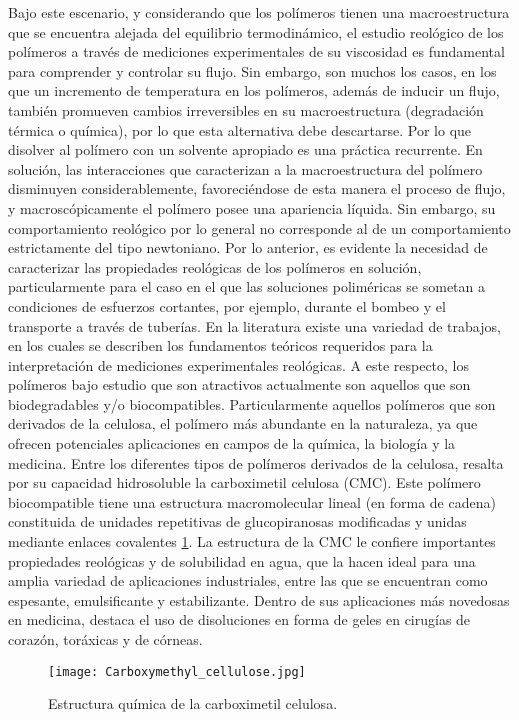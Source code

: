 \documentclass{elsarticle}
\begin{document}
Bajo este escenario, y considerando que los pol\'imeros tienen una macroestructura que se encuentra alejada del equilibrio termodin\'amico, el estudio reol\'ogico de los pol\'imeros a trav\'es de mediciones experimentales de su viscosidad es fundamental para comprender y controlar su flujo. Sin embargo, son muchos los casos, en los que un incremento de temperatura en los pol\'imeros, adem\'as de inducir un flujo, también promueven cambios irreversibles en su macroestructura (degradación t\'ermica o qu\'imica), por lo que esta alternativa debe descartarse. Por lo que disolver al pol\'imero con un solvente apropiado es una práctica recurrente\cite{R5}. En soluci\'on, las interacciones que caracterizan a la macroestructura del pol\'imero disminuyen considerablemente, favoreciéndose de esta manera el proceso de flujo, y macrosc\'opicamente el pol\'imero posee una apariencia l\'iquida. Sin embargo, su comportamiento reol\'ogico por lo general no corresponde al de un comportamiento estrictamente del tipo newtoniano. Por lo anterior, es evidente la necesidad de caracterizar las propiedades reol\'ogicas de los pol\'imeros en soluci\'on, particularmente para el caso en el que las soluciones polim\'ericas se sometan a condiciones de esfuerzos cortantes, por ejemplo, durante el bombeo y el transporte a trav\'es de tuber\'ias.\newline
En la literatura existe una variedad de trabajos\cite{R6,R7,R8,R9,R10}, en los cuales se describen los fundamentos te\'oricos requeridos para la interpretaci\'on de mediciones experimentales reol\'ogicas. A este respecto, los pol\'imeros bajo estudio que son atractivos actualmente son aquellos que son biodegradables y/o biocompatibles. Particularmente aquellos pol\'imeros que son derivados de la celulosa, el pol\'imero m\'as abundante en la naturaleza, ya que ofrecen potenciales aplicaciones en campos de la qu\'imica, la biolog\'ia y la medicina. Entre los diferentes tipos de pol\'imeros derivados de la celulosa, resalta por su capacidad hidrosoluble la carboximetil celulosa (CMC). Este pol\'imero biocompatible tiene una estructura macromolecular lineal (en forma de cadena) constituida de unidades repetitivas de glucopiranosas modificadas y unidas mediante enlaces covalentes \ref{Figura 1}. La estructura de la CMC le confiere importantes propiedades reol\'ogicas y de solubilidad en agua, que la hacen ideal para una amplia variedad de aplicaciones industriales, entre las que se encuentran como espesante, emulsificante y estabilizante. Dentro de sus aplicaciones m\'as novedosas en medicina, destaca el uso de disoluciones en forma de geles en cirug\'ias de coraz\'on, tor\'axicas y de c\'orneas\cite{R11,R12}.
\begin{figure}[htb!] %
    \centering
    \texttt{[image: Carboxymethyl\_cellulose.jpg]} %
    \caption{Estructura qu\'imica de la carboximetil celulosa.}
    \label{Figura 1}
\end{figure}
\end{document}
